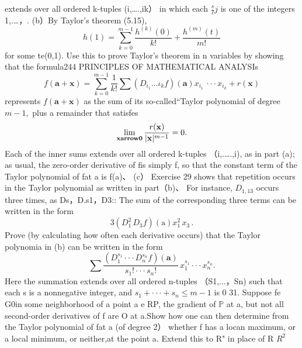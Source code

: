 extends over all ordered k-tuples (i,….,ik） in which each ${\frac{s}{\ell}}j$ is one of the integers 1,.…，. (b）By Taylor's theorem (5.15), $$ h(1)=\sum_{k=0}^{m-1}\frac{h^{(k)}(0)}{k!}+\frac{h^{(m)}(t)}{m!} $$ for some te(0,1). Use this to prove Taylor's theorem in n variables by showing that the formula244 PRINCIPLES OF MATHEMATICAL ANALYSIs $$ f(\mathbf{a}+\mathbf{x})=\sum_{k=0}^{m-1}{\frac{1}{k!}}\sum(D_{i_{1}}\dots\iota_{k}f)(\mathbf{a})x_{i_{1}}\,\cdot\cdot\cdot x_{i_{k}}+r(\mathbf{x}) $$ represents $f(\mathbf{a}+\mathbf{x})$ as the sum of its so-called“Taylor polynomial of degree $m-1,$ plus a remainder that satisfes $$ \operatorname*{lim}_{\bf x arrow0}\frac{r({\bf x})}{|{\bf x}|^{m-1}}=0. $$ Each of the inner sums extends over all ordered k-tuples （i,.….,i), as in part (a); as usual, the zero-order derivative of fis simply f, so that the constant term of the Taylor polynomial of fat a is f(a)、 (c） Exercise 29 shows that repetition occurs in the Taylor polynomial as written in part（b)、 For instance, $D_{1,13}$ occurs three times, as Ds，D.s1，D3:: The sum of the corresponding three terms can be written in the form $$ 3(D_{1}^{2}\,D_{3}f)(\mathrm{a})x_{1}^{2}\,x_{3}\,. $$ Prove (by calculating how often each derivative occurs) that the Taylor polynomia in (b) can be written in the form $$ \sum{\frac{(D_{1}^{s_{1}}\cdot\cdot\cdot D_{n}^{s_{n}}f)(\mathbf{a})}{s_{1}!\cdot\cdot\cdot s_{n}!}}\,x_{1}^{s_{1}}\cdot\cdot\cdot x_{n}^{s_{n}}. $$ Here the summation extends over all ordered n-tuples （S1,...，Sn) such that each s is a nonnegative integer, and $s_{1}+\cdot\cdot\cdot+s_{n}\leq m-1$ is 0 31. Suppose fe G0in some neighborhood of a point a e RP, the gradient of $\mathbb{P}$ at a, but not all second-order derivatives of f are O at a.Show how one can then determine from the Taylor polynomial of fat a (of degree 2） whether f has a locan maximum, or a local minimum, or neither,at the point a. Extend this to R" in place of R $R^{2}$